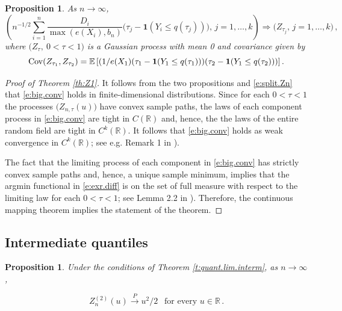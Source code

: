 \documentclass[12pt]{amsart}
\newcommand{\R}{\mathbb{R}}
\newcommand{\1}{\mathbbm{1}}
\newcommand{\0}{\mathbf{0}}
\newcommand{\one}{\mathbf{1}}
\newcommand{\E}{\mathbb{E}}
\theoremstyle{plain}
\newtheorem{proposition}[theorem]{Proposition}
\theoremstyle{definition}
\newcommand{\cip}{\overset{P}\to}
\begin{document}
\begin{proposition}
\medskip  \noindent {\rm Case 2: $\gamma_1>2$ or $\gamma_1=2$ and $\E(1/e(X_1))<\infty$.}  As $n\to\infty$,
$$
  \left( n^{-1/2} \sum_{i=1}^n \frac{D_i}{\max(e(X_i),b_n)}
  \bigl( \tau_j-\one(Y_i\leq q(\tau_j))\bigr), \, j=1,\ldots, k\right) 
 \Rightarrow \bigl( Z_{\tau_j}, \, j=1,\ldots, k\bigr)\,,
$$
where $\bigl( Z_{\tau},~0<\tau<1 \bigr)$ is a Gaussian process with mean 0 and covariance given by
$$
{\rm Cov}(Z_{\tau_1},Z_{\tau_2})=\E\left[\left(1/e(X_1)(\tau_1-\one(Y_1\leq q(\tau_1)))(\tau_2-\one(Y_1\leq q(\tau_2))\right)\right].
$$

\end{proposition}



\begin{proof}[Proof of Theorem \ref{th:Z1}]
It follows from the two propositions and \eqref{e:split.Zn} that \eqref{e:big.conv} holds in finite-dimensional distributions. Since for each $0<\tau<1$ the processes $\bigl(Z_{n,\tau}(u)\bigr)$ have convex sample paths, the laws of each component process in 
\eqref{e:big.conv} are tight in $C(\R)$ and, hence, the the laws of the entire random field are tight in $C^k(\R)$. 
It follows that \eqref{e:big.conv} holds as weak convergence in $C^k(\R)$; see e.g. Remark 1 in \cite{davis1992m}).

The fact that the limiting process of each component in \eqref{e:big.conv} has strictly convex sample paths and, hence, a unique sample minimum, implies that the argmin functional in \eqref{e:exr.diff} is on the set of full measure with respect to the limiting law for each $0<\tau<1$; see Lemma 2.2 in \cite{davis1992m}). Therefore, the continuous mapping theorem implies the statement of the theorem. 
\end{proof}

 \subsection{Intermediate quantiles}


\begin{proposition} \label{prop:cip.inter}
    Under the conditions of Theorem \ref{t:quant.lim.interm}, as $n\to\infty$, 
    
\begin{equation*}
Z_n^{(2)}(u) \cip u^2/2~~\mbox{ for every }u\in\R\,. 
\end{equation*}
\end{proposition}
%
\end{document}
